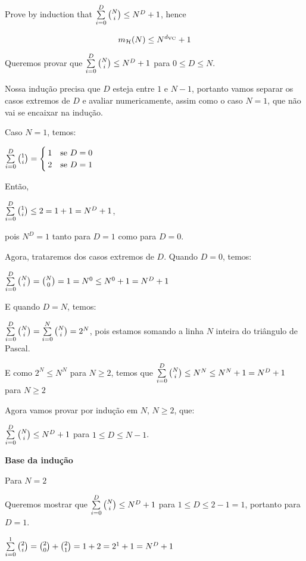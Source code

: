 \begin{enunciado}{5}
    Prove by induction that $\sum\limits_{i=0}^{D} {{N} \choose {i}} \le N^D + 1$, hence 
    
    $$ m_{\mathcal{H}}(N) \le N^{d_{\text{VC}}} + 1 $$
\end{enunciado}

Queremos provar que $ \sum\limits_{i=0}^D {{N} \choose {i}} \le N^D + 1$ para $0 \le D \le N$.

Nossa indução precisa que $D$ esteja entre $1$ e $N - 1$, portanto vamos separar os casos extremos de $D$ e avaliar numericamente, assim como o caso $N = 1$, que não vai se encaixar na indução.

Caso $N = 1$, temos:

$\sum\limits_{i=0}^{D} {{1} \choose {i}} = \begin{cases}
1&\text{se }D = 0\\
2&\text{se }D = 1
\end{cases}$

Então,

$\sum\limits_{i=0}^{D} {{1} \choose {i}} \le 2 = 1 + 1 = N^D + 1$,

pois $N^D = 1$ tanto para $D = 1$ como para $D = 0$.

Agora, trataremos dos casos extremos de $D$.
Quando $D = 0$, temos:

$\sum\limits_{i=0}^D {{N} \choose {i}} = {{N} \choose {0}} = 1 = N^0 \le N^0 + 1 = N^D + 1$

E quando $D = N$, temos:

$\sum\limits_{i=0}^D {{N} \choose {i}} = \sum\limits_{i=0}^N {{N} \choose {i}} = 2^N$, pois estamos somando a linha $N$ inteira do triângulo de Pascal.

E como $2^N \le N^N$ para $N \ge 2$, temos que $\sum\limits_{i=0}^D {{N} \choose {i}} \le N^N \le N^N + 1 = N^D + 1$ para $N \ge 2$


\vspace{3pt}

Agora vamos provar por indução em $N$, $N \ge 2$, que:

$\sum\limits_{i=0}^D {{N} \choose {i}} \le N^D + 1$ para $1 \le D \le N - 1$.

\textbf{Base da indução}

Para $N = 2$

Queremos mostrar que $\sum\limits_{i=0}^D {{N} \choose {i}} \le N^D + 1$ para $1 \le D \le 2 - 1 = 1$, portanto para $D = 1$.

$\sum\limits_{i=0}^1 {{2} \choose {i}} = {{2} \choose {0}} + {{2} \choose {1}} = 1 + 2 = 2^1 + 1 = N^D + 1$

